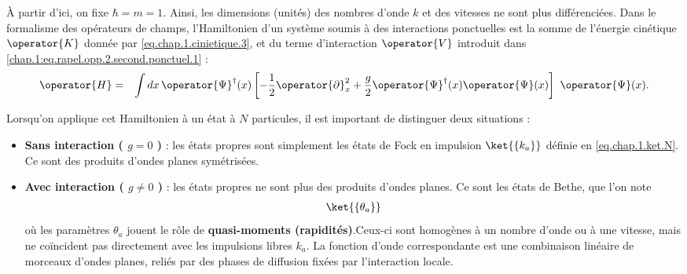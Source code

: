 À partir d’ici, on fixe $\hbar = m = 1 $. Ainsi, les dimensions (unités) des nombres d’onde $k$ et des vitesses ne sont plus différenciées.
Dans le formalisme des opérateurs de champs, l’Hamiltonien d’un système soumis à des interactions ponctuelles est la somme de l’énergie cinétique $\operator{K}$ donnée par \eqref{eq.chap.1.cinietique.3}, et du terme d’interaction $\operator{V}$ introduit dans \eqref{chap.1:eq.rapel.opp.2.second.ponctuel.1} :
\begin{eqnarray}\label{chap.1:eq.LL.champ.1}
	\operator{H} & = & \int dx \, \operator{\Psi}^\dag (x)\left [-\frac{1}{2}\operator{\partial}_x^2 + \frac{g}{2}  \operator{\Psi}^\dag (x) \operator{\Psi} (x) \right ] \operator{\Psi} (x) \label{chap:1:ham.mod}.
\end{eqnarray}

\medskip


Lorsqu’on applique cet Hamiltonien à un état à $N$ particules, il est important de distinguer deux situations :
\begin{itemize}[label = $\bullet$]
	\item {\bf Sans interaction ( $g =0$ )} : les états propres sont simplement les états de Fock en impulsion $\ket{\{k_a \}}$ définie en \eqref{eq.chap.1.ket.N}. Ce sont des produits d’ondes planes symétrisées.
	\item {\bf Avec interaction ( $g \neq 0$ )} : les états propres ne sont plus des produits d’ondes planes. Ce sont les états de Bethe, que l’on note 
		\begin{eqnarray}
			\ket{\{\theta_a \}}	
		\end{eqnarray}
		où les paramètres $\theta_a$ jouent le rôle de {\bf quasi-moments (rapidités)}.Ceux-ci sont homogènes à un nombre d’onde ou à une vitesse, mais ne coïncident pas directement avec les impulsions libres $k_a$. La fonction d’onde correspondante est une combinaison linéaire de morceaux d’ondes planes, reliés par des phases de diffusion fixées par l’interaction locale.
\end{itemize}

\medskip

